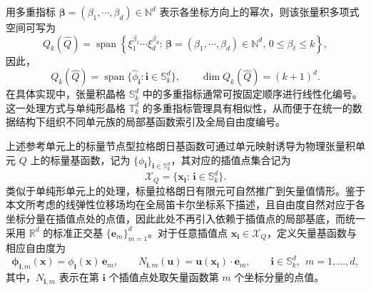 用多重指标 $\boldsymbol{\beta} = (\beta_1,\cdots,\beta_d)\in\mathbb{N}^d$ 表示各坐标方向上的幂次，则该张量积多项式空间可写为
\[
Q_k(\hat{Q}) = \operatorname{span}\left\{
\xi_1^{\beta_1}\cdots\xi_d^{\beta_d}:\,\boldsymbol{\beta} = (\beta_1,\cdots,\beta_d)\in\mathbb{N}^d,\,0\leq\beta_\ell\leq{k}
\right\},
\]
因此，
\[
Q_k(\hat Q) = \operatorname{span}\{\hat{\phi}_{\boldsymbol{i}}:\boldsymbol{i}\in\mathbb{S}_k^d\}, \qquad \dim Q_k(\hat Q)=(k+1)^d.
\]
在具体实现中，张量积晶格 $\mathbb{S}_k^d$ 中的多重指标通常可按固定顺序进行线性化编号。这一处理方式与单纯形晶格 $\mathbb{T}_k^d$ 的多重指标管理具有相似性，从而便于在统一的数据结构下组织不同单元族的局部基函数索引及全局自由度编号。

%

上述参考单元上的标量节点型拉格朗日基函数可通过单元映射诱导为物理张量积单元 $Q$ 上的标量基函数，记为 $\{\phi_{\boldsymbol{i}}\}_{\boldsymbol{i}\in\mathbb{S}_k^d}$，其对应的插值点集合记为
\[
\mathcal{X}_Q=\{\boldsymbol{x}_{\boldsymbol{i}}:\,\boldsymbol{i}\in\mathbb{S}_k^d\}.
\]
类似于单纯形单元上的处理，标量拉格朗日有限元可自然推广到矢量值情形。鉴于本文所考虑的线弹性位移场均在全局笛卡尔坐标系下描述，且自由度自然对应于各坐标分量在插值点处的点值，因此此处不再引入依赖于插值点的局部基底，而统一采用 $\mathbb{R}^d$ 的标准正交基 $\{\boldsymbol{e}_m\}_{m=1}^d$。对于任意插值点 $\boldsymbol{x}_{\boldsymbol{i}}\in\mathcal{X}_Q$，定义矢量基函数与相应自由度为
\[
\boldsymbol{\phi}_{\boldsymbol{i},m}(\boldsymbol{x}) = \phi_{\boldsymbol{i}}(\boldsymbol{x})\,\boldsymbol{e}_m, \qquad N_{\boldsymbol{i},m}(\boldsymbol{u}) = \boldsymbol{u}(\boldsymbol{x}_{\boldsymbol{i}})\cdot\boldsymbol{e}_m, \qquad \boldsymbol{i}\in\mathbb{S}_k^d,\ \ m=1,\dots,d,
\]
其中，$N_{\boldsymbol{i},m}$ 表示在第 $\boldsymbol{i}$ 个插值点处取矢量函数第 $m$ 个坐标分量的点值。

